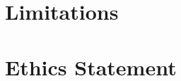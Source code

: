 \documentclass[11pt]{article}
\begin{document}

\section*{Limitations}


\section*{Ethics Statement}



\end{document}
